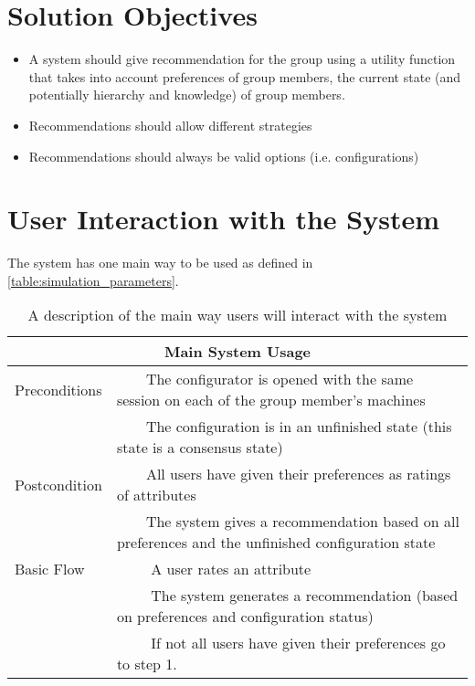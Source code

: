 \documentclass{article}
\newcommand{\tabitem}[1][\textbullet]{~~\llap{#1}~~}
\begin{document}
\section{Solution Objectives}

\begin{itemize}
    \item A system should give recommendation for the group using a utility function that takes into account preferences of group members, the current state (and potentially hierarchy and knowledge)  of group members.
    \item Recommendations should allow different strategies
    \item Recommendations should always be valid options (i.e. configurations)
\end{itemize}

\section{User Interaction with the System}
The system has one main way to be used as defined in \autoref{table:simulation_parameters}.

\begin{table}
    \begin{center}
        \begin{tabularx}{\columnwidth}{l|X}
            \multicolumn{2}{c}{Main System Usage} \\
            \hline
            Preconditions   & \tabitem The configurator is opened with the same session on each of the group member's machines \\
                            & \tabitem The configuration is in an unfinished state (this state is a consensus state)\\
            \hline
            Postcondition   & \tabitem All users have given their preferences as ratings of attributes \\
                            & \tabitem The system gives a recommendation based on all preferences and the unfinished configuration state \\
            \hline
            Basic Flow      & \tabitem[1.] A user rates an attribute \\
                            & \tabitem[2.] The system generates a recommendation (based on preferences and configuration status) \\
                            & \tabitem[3.] If not all users have given their preferences go to step 1. \\
            \hline
        \end{tabularx}
        \caption{A description of the main way users will interact with the system}
        \label{table:simulation_parameters}
    \end{center}
\end{table}
\end{document}
